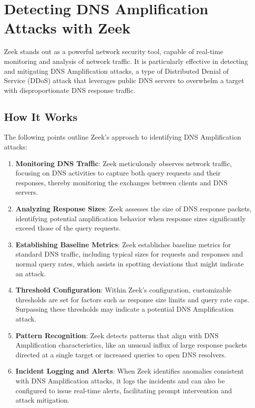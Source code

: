 \section{Detecting DNS Amplification Attacks with Zeek}
Zeek stands out as a powerful network security tool, capable of real-time monitoring and analysis of network traffic. It is particularly effective in detecting and mitigating DNS Amplification attacks, a type of Distributed Denial of Service (DDoS) attack that leverages public DNS servers to overwhelm a target with disproportionate DNS response traffic.
\subsection{How It Works}
The following points outline Zeek's approach to identifying DNS Amplification attacks:

\begin{enumerate}
    \item \textbf{Monitoring DNS Traffic}: Zeek meticulously observes network traffic, focusing on DNS activities to capture both query requests and their responses, thereby monitoring the exchanges between clients and DNS servers.
    
    \item \textbf{Analyzing Response Sizes}: Zeek assesses the size of DNS response packets, identifying potential amplification behavior when response sizes significantly exceed those of the query requests.
    
    \item \textbf{Establishing Baseline Metrics}: Zeek establishes baseline metrics for standard DNS traffic, including typical sizes for requests and responses and normal query rates, which assists in spotting deviations that might indicate an attack.
    
    \item \textbf{Threshold Configuration}: Within Zeek's configuration, customizable thresholds are set for factors such as response size limits and query rate caps. Surpassing these thresholds may indicate a potential DNS Amplification attack.
    
    \item \textbf{Pattern Recognition}: Zeek detects patterns that align with DNS Amplification characteristics, like an unusual influx of large response packets directed at a single target or increased queries to open DNS resolvers.
    
    \item \textbf{Incident Logging and Alerts}: When Zeek identifies anomalies consistent with DNS Amplification attacks, it logs the incidents and can also be configured to issue real-time alerts, facilitating prompt intervention and attack mitigation.
\end{enumerate}
